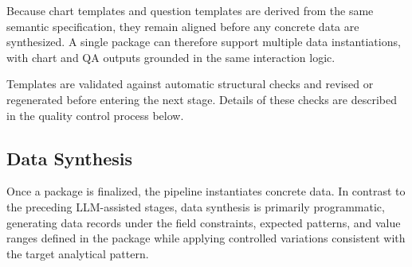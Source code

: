 \documentclass[review,journal,hideappendix]{vgtc} %
\begin{document}
Because chart templates and question templates are derived from the same semantic specification, they remain aligned before any concrete data are synthesized. A single package can therefore support multiple data instantiations, with chart and QA outputs grounded in the same interaction logic.

Templates are validated against automatic structural checks and revised or regenerated before entering the next stage. Details of these checks are described in the quality control process below.

\subsection{Data Synthesis}

Once a package is finalized, the pipeline instantiates concrete data. In contrast to the preceding LLM-assisted stages, data synthesis is primarily programmatic, generating data records under the field constraints, expected patterns, and value ranges defined in the package while applying controlled variations consistent with the target analytical pattern.
\end{document}
